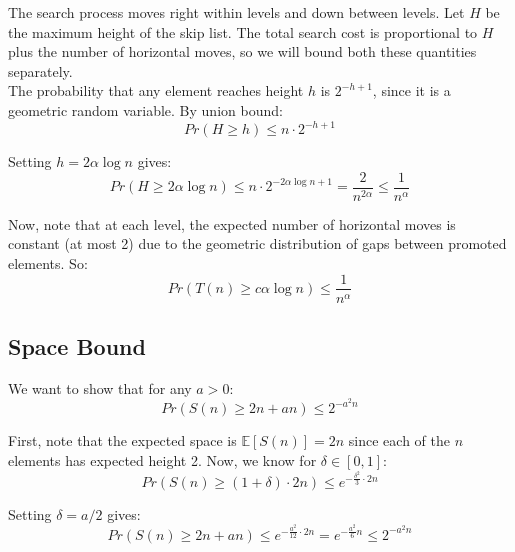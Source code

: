 \documentclass[a4paper]{article}
\begin{document}
\noindent The search process moves right within levels and down between levels. Let $H$ be the maximum height of the skip list. The total search cost is proportional to $H$ plus the number of horizontal moves, so we will bound both these quantities separately. \\

\noindent The probability that any element reaches height $h$ is $2^{-h+1}$, since it is a geometric random variable. By union bound:
\[Pr(H \geq h) \leq n \cdot 2^{-h+1}\]

\noindent Setting $h = 2\alpha \log n$ gives:
\[Pr(H \geq 2\alpha \log n) \leq n \cdot 2^{-2\alpha \log n + 1} = \frac{2}{n^{2\alpha}} \leq \frac{1}{n^\alpha}\]

\noindent Now, note that at each level, the expected number of horizontal moves is constant (at most 2) due to the geometric distribution of gaps between promoted elements. So:
\[Pr(T(n) \geq c \alpha \log n) \leq \frac{1}{n^\alpha}\]

\subsection*{Space Bound}
We want to show that for any $a > 0$:
\[Pr(S(n) \geq 2n + an) \leq 2^{-a^2 n}\]

\noindent First, note that the expected space is $\mathbb{E}[S(n)] = 2n$ since each of the $n$ elements has expected height 2. Now, we know for $\delta \in [0,1]$:
\[Pr(S(n) \geq (1+\delta) \cdot 2n) \leq e^{-\frac{\delta^2}{3} \cdot 2n}\]

\noindent Setting $\delta = a/2$ gives:
\[Pr(S(n) \geq 2n + an) \leq e^{-\frac{a^2}{12} \cdot 2n} = e^{-\frac{a^2}{6} n} \leq 2^{-a^2 n}\]
\end{document}
